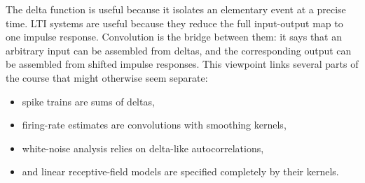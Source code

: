 \documentclass[11pt]{article}
\begin{document}
The delta function is useful because it isolates an elementary event at a precise time. LTI systems are useful because they reduce the full input-output map to one impulse response. Convolution is the bridge between them: it says that an arbitrary input can be assembled from deltas, and the corresponding output can be assembled from shifted impulse responses. This viewpoint links several parts of the course that might otherwise seem separate:
\begin{itemize}
    \item spike trains are sums of deltas,
    \item firing-rate estimates are convolutions with smoothing kernels,
    \item white-noise analysis relies on delta-like autocorrelations,
    \item and linear receptive-field models are specified completely by their kernels.
\end{itemize}
\end{document}
